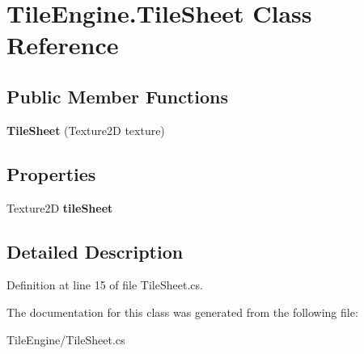 \hypertarget{class_tile_engine_1_1_tile_sheet}{\section{Tile\-Engine.\-Tile\-Sheet Class Reference}
\label{class_tile_engine_1_1_tile_sheet}
}
\subsection*{Public Member Functions}
\begin{DoxyCompactItemize}
\item 
\hypertarget{class_tile_engine_1_1_tile_sheet_a74fd1ec39c58a55b1494a6f5071c837d}{{\bfseries Tile\-Sheet} (Texture2\-D texture)}\label{class_tile_engine_1_1_tile_sheet_a74fd1ec39c58a55b1494a6f5071c837d}

\end{DoxyCompactItemize}
\subsection*{Properties}
\begin{DoxyCompactItemize}
\item 
\hypertarget{class_tile_engine_1_1_tile_sheet_a6d1063b12cabd250a4f6a3a286e1e18e}{Texture2\-D {\bfseries tile\-Sheet}}\label{class_tile_engine_1_1_tile_sheet_a6d1063b12cabd250a4f6a3a286e1e18e}

\end{DoxyCompactItemize}


\subsection{Detailed Description}


Definition at line 15 of file Tile\-Sheet.\-cs.



The documentation for this class was generated from the following file\-:\begin{DoxyCompactItemize}
\item 
Tile\-Engine/Tile\-Sheet.\-cs\end{DoxyCompactItemize}
